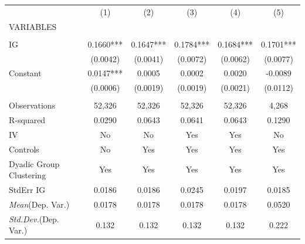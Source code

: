 \documentclass[]{article}
\begin{document}
\begin{tabular}{lccccc} \hline
 & (1) & (2) & (3) & (4) & (5) \\
VARIABLES &  &  &  &  &  \\ \hline
 &  &  &  &  &  \\
IG & 0.1660*** & 0.1647*** & 0.1784*** & 0.1684*** & 0.1701*** \\
 & (0.0042) & (0.0041) & (0.0072) & (0.0062) & (0.0077) \\
Constant & 0.0147*** & 0.0005 & 0.0002 & 0.0020 & -0.0089 \\
 & (0.0006) & (0.0019) & (0.0019) & (0.0021) & (0.0112) \\
 &  &  &  &  &  \\
Observations & 52,326 & 52,326 & 52,326 & 52,326 & 4,268 \\
R-squared & 0.0290 & 0.0643 & 0.0641 & 0.0643 & 0.1290 \\
IV & No & No & Yes & Yes & No \\
Controls & No & Yes & Yes & Yes & Yes \\
Dyadic Group Clustering & Yes & Yes & Yes & Yes & Yes \\
StdErr IG & 0.0186 & 0.0186 & 0.0245 & 0.0197 & 0.0185 \\
\textit{Mean}(Dep. Var.) & 0.0178 & 0.0178 & 0.0178 & 0.0178 & 0.0520 \\
 \textit{Std.Dev.}(Dep. Var.) & 0.132 & 0.132 & 0.132 & 0.132 & 0.222 \\ \hline
\end{tabular}
\end{document}
